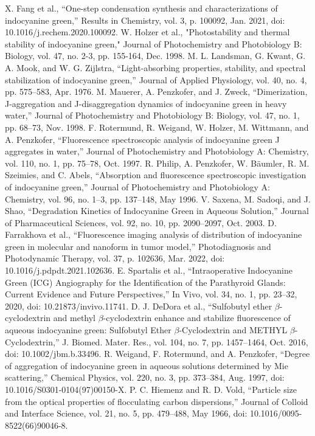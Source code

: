 \begin{thebibliography}{99}
 X. Fang et al., “One-step condensation synthesis and characterizations of indocyanine green,” Results in Chemistry, vol. 3, p. 100092, Jan. 2021, doi: 10.1016/j.rechem.2020.100092.
W. Holzer et al., "Photostability and thermal stability of indocyanine green," Journal of Photochemistry and Photobiology B: Biology,  vol. 47, no. 2-3, pp. 155-164, Dec. 1998.
M. L. Landsman, G. Kwant, G. A. Mook, and W. G. Zijlstra, “Light-absorbing properties, stability, and spectral stabilization of indocyanine green,” Journal of Applied Physiology, vol. 40, no. 4, pp. 575–583, Apr. 1976.
M. Mauerer, A. Penzkofer, and J. Zweck, “Dimerization, J-aggregation and J-disaggregation dynamics of indocyanine green in heavy water,” Journal of Photochemistry and Photobiology B: Biology, vol. 47, no. 1, pp. 68–73, Nov. 1998.
F. Rotermund, R. Weigand, W. Holzer, M. Wittmann, and A. Penzkofer, “Fluorescence spectroscopic analysis of indocyanine green J aggregates in water,” Journal of Photochemistry and Photobiology A: Chemistry, vol. 110, no. 1, pp. 75–78, Oct. 1997.
R. Philip, A. Penzkofer, W. Bäumler, R. M. Szeimies, and C. Abels, “Absorption and fluorescence spectroscopic investigation of indocyanine green,” Journal of Photochemistry and Photobiology A: Chemistry, vol. 96, no. 1–3, pp. 137–148, May 1996.
V. Saxena, M. Sadoqi, and J. Shao, “Degradation Kinetics of Indocyanine Green in Aqueous Solution,” Journal of Pharmaceutical Sciences, vol. 92, no. 10, pp. 2090–2097, Oct. 2003. 
D. Farrakhova et al., “Fluorescence imaging analysis of distribution of indocyanine green in molecular and nanoform in tumor model,” Photodiagnosis and Photodynamic Therapy, vol. 37, p. 102636, Mar. 2022, doi: 10.1016/j.pdpdt.2021.102636.
 E. Spartalis et al., “Intraoperative Indocyanine Green (ICG) Angiography for the Identification of the Parathyroid Glands: Current Evidence and Future Perspectives,” In Vivo, vol. 34, no. 1, pp. 23–32, 2020, doi: 10.21873/invivo.11741.
D. J. DeDora et al., “Sulfobutyl ether $\beta$-cyclodextrin and methyl $\beta$-cyclodextrin enhance and stabilize fluorescence of aqueous indocyanine green: Sulfobutyl Ether $\beta$-Cyclodextrin and METHYL $\beta$-Cyclodextrin,” J. Biomed. Mater. Res., vol. 104, no. 7, pp. 1457–1464, Oct. 2016, doi: 10.1002/jbm.b.33496.
R. Weigand, F. Rotermund, and A. Penzkofer, “Degree of aggregation of indocyanine green in aqueous solutions determined by Mie scattering,” Chemical Physics, vol. 220, no. 3, pp. 373–384, Aug. 1997, doi: 10.1016/S0301-0104(97)00150-X.
 P. C. Hiemenz and R. D. Vold, “Particle size from the optical properties of flocculating carbon dispersions,” Journal of Colloid and Interface Science, vol. 21, no. 5, pp. 479–488, May 1966, doi: 10.1016/0095-8522(66)90046-8.


\end{thebibliography}
